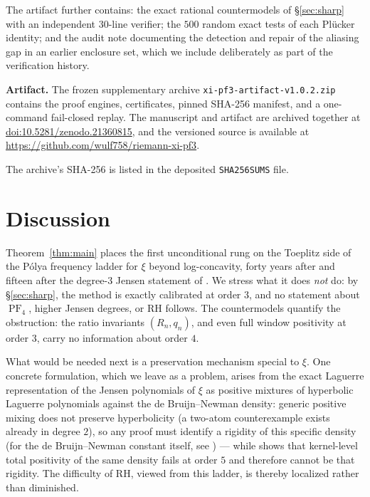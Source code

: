 \documentclass[11pt]{amsart}
\theoremstyle{definition}
\theoremstyle{remark}
\DeclareMathOperator{\PF}{PF}
\begin{document}
The artifact further contains: the exact rational countermodels of
\S\ref{sec:sharp} with an independent $30$-line verifier; the $500$
random exact tests of each Pl\"ucker identity; and the audit note
documenting the detection and repair of the aliasing gap in an earlier
enclosure set, which we include deliberately as part of the
verification history.

\smallskip
\noindent\textbf{Artifact.} The frozen supplementary archive
\texttt{xi-pf3-artifact-v1.0.2.zip} contains the proof engines,
certificates, pinned SHA-256 manifest, and a one-command fail-closed
replay. The manuscript and artifact are archived together at
\href{https://doi.org/10.5281/zenodo.21360815}{doi:10.5281/zenodo.21360815},
and the versioned source is available at
\url{https://github.com/wulf758/riemann-xi-pf3}.
\par\noindent
The archive's SHA-256 is listed
in the deposited \texttt{SHA256SUMS} file.

\section{Discussion}\label{sec:discussion}

Theorem~\ref{thm:main} places the first unconditional rung on the
Toeplitz side of the P\'olya frequency ladder for $\xi$ beyond
log-concavity, forty years after \cite{CNV86} and fifteen after the
degree-$3$ Jensen statement of \cite{DL11}. We stress what it does
\emph{not} do: by \S\ref{sec:sharp}, the method is exactly calibrated
at order $3$, and no statement about $\PF_4$, higher Jensen degrees, or
RH follows. The countermodels quantify the obstruction: the ratio
invariants $(R_n,q_n)$, and even full window positivity at order $3$,
carry no information about order $4$.

What would be needed next is a preservation mechanism special to
$\xi$. One concrete formulation, which we leave as a problem, arises
from the exact Laguerre representation of the Jensen polynomials of
$\xi$ as positive mixtures of hyperbolic Laguerre polynomials against
the de Bruijn--Newman density: generic positive mixing does not
preserve hyperbolicity (a two-atom counterexample exists already in
degree $2$), so any proof must identify a rigidity of this specific
density (for the de Bruijn--Newman constant itself, see
\cite{RodgersTao}) --- while \cite{Michalowski26} shows that kernel-level total
positivity of the same density fails at order $5$ and therefore cannot
be that rigidity. The difficulty of RH, viewed from this ladder, is
thereby localized rather than diminished.
\end{document}

